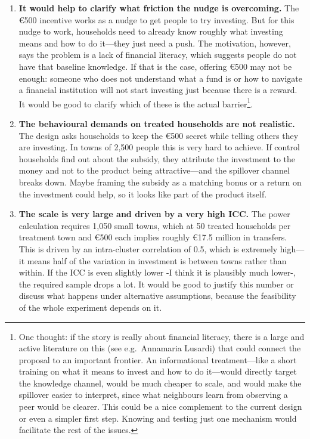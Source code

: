 \documentclass[11pt,a4paper]{article}
\begin{document}
\begin{enumerate}[leftmargin=*, itemsep=6pt]

\item \textbf{It would help to clarify what friction the nudge is overcoming.} The \euro{500} incentive works as a nudge to get people to try investing. But for this nudge to work, households need to already know roughly what investing means and how to do it---they just need a push. The motivation, however, says the problem is a lack of financial literacy, which suggests people do not have that baseline knowledge. If that is the case, offering \euro{500} may not be enough: someone who does not understand what a fund is or how to navigate a financial institution will not start investing just because there is a reward. It would be good to clarify which of these is the actual barrier\footnote{One thought: if the story is really about financial literacy, there is a large and active literature on this (see e.g.\ Annamaria Lusardi) that could connect the proposal to an important frontier. An informational treatment---like a short training on what it means to invest and how to do it---would directly target the knowledge channel, would be much cheaper to scale, and would make the spillover easier to interpret, since what neighbours learn from observing a peer would be clearer. This could be a nice complement to the current design or even a simpler first step. Knowing and testing just one mechanism would facilitate the rest of the issues.}.

\item \textbf{The behavioural demands on treated households are not realistic.} The design asks households to keep the \euro{500} secret while telling others they are investing. In towns of 2,500 people this is very hard to achieve. If control households find out about the subsidy, they attribute the investment to the money and not to the product being attractive---and the spillover channel breaks down. Maybe framing the subsidy as a matching bonus or a return on the investment could help, so it looks like part of the product itself.

\item \textbf{The scale is very large and driven by a very high ICC.} The power calculation requires 1,050 small towns, which at 50 treated households per treatment town and \euro{500} each implies roughly \euro{17.5 million} in transfers. This is driven by an intra-cluster correlation of 0.5, which is extremely high---it means half of the variation in investment is between towns rather than within. If the ICC is even slightly lower -I think it is plausibly much lower-, the required sample drops a lot. It would be good to justify this number or discuss what happens under alternative assumptions, because the feasibility of the whole experiment depends on it.


\end{enumerate}
\end{document}
